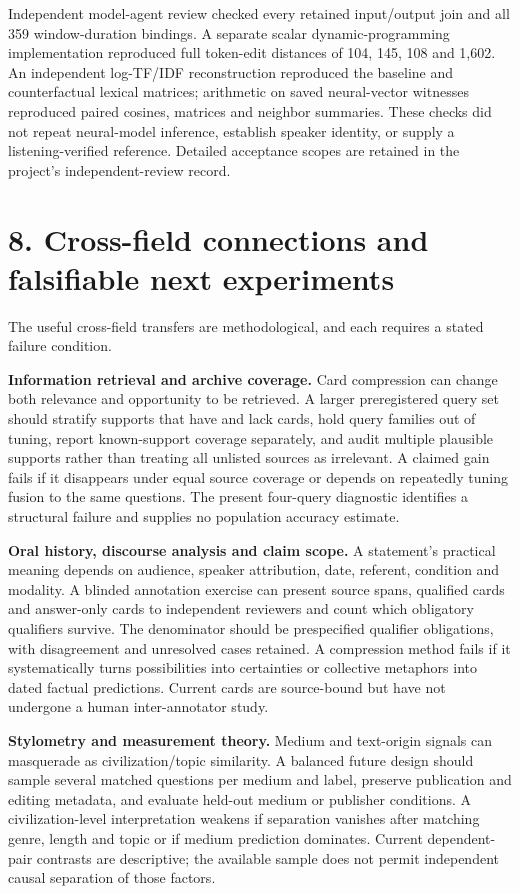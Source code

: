 \documentclass[
  10pt,
]{article}
\begin{document}
Independent model-agent review checked every retained input/output join
and all 359 window-duration bindings. A separate scalar
dynamic-programming implementation reproduced full token-edit distances
of 104, 145, 108 and 1,602. An independent log-TF/IDF reconstruction
reproduced the baseline and counterfactual lexical matrices; arithmetic
on saved neural-vector witnesses reproduced paired cosines, matrices and
neighbor summaries. These checks did not repeat neural-model inference,
establish speaker identity, or supply a listening-verified reference.
Detailed acceptance scopes are retained in the project's
independent-review record.

\section{8. Cross-field connections and falsifiable next
experiments}\label{cross-field-connections-and-falsifiable-next-experiments}

The useful cross-field transfers are methodological, and each requires a
stated failure condition.

\textbf{Information retrieval and archive coverage.} Card compression
can change both relevance and opportunity to be retrieved. A larger
preregistered query set should stratify supports that have and lack
cards, hold query families out of tuning, report known-support coverage
separately, and audit multiple plausible supports rather than treating
all unlisted sources as irrelevant. A claimed gain fails if it
disappears under equal source coverage or depends on repeatedly tuning
fusion to the same questions. The present four-query diagnostic
identifies a structural failure and supplies no population accuracy
estimate.

\textbf{Oral history, discourse analysis and claim scope.} A statement's
practical meaning depends on audience, speaker attribution, date,
referent, condition and modality. A blinded annotation exercise can
present source spans, qualified cards and answer-only cards to
independent reviewers and count which obligatory qualifiers survive. The
denominator should be prespecified qualifier obligations, with
disagreement and unresolved cases retained. A compression method fails
if it systematically turns possibilities into certainties or collective
metaphors into dated factual predictions. Current cards are source-bound
but have not undergone a human inter-annotator study.

\textbf{Stylometry and measurement theory.} Medium and text-origin
signals can masquerade as civilization/topic similarity. A balanced
future design should sample several matched questions per medium and
label, preserve publication and editing metadata, and evaluate held-out
medium or publisher conditions. A civilization-level interpretation
weakens if separation vanishes after matching genre, length and topic or
if medium prediction dominates. Current dependent-pair contrasts are
descriptive; the available sample does not permit independent causal
separation of those factors.
\end{document}
